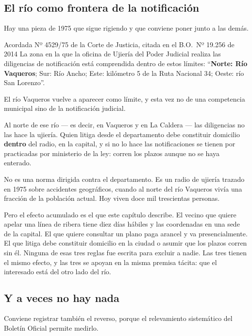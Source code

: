\subsection*{El río como frontera de la notificación}

Hay una pieza de 1975 que sigue rigiendo y que conviene poner junto a las demás.

\begin{ficha}{Acordada Nº 4529/75 de la Corte de Justicia, citada en el B.O.\ Nº 19.256 de 2014}
La zona en la que la oficina de Ujiería del Poder Judicial realiza las diligencias de notificación está comprendida dentro de estos límites: ``\textbf{Norte: Río Vaqueros}; Sur: Río Ancho; Este: kilómetro 5 de la Ruta Nacional 34; Oeste: río San Lorenzo''.
\end{ficha}

El río Vaqueros vuelve a aparecer como límite, y esta vez no de una competencia municipal sino de la notificación judicial.

Al norte de ese río --- es decir, en Vaqueros y en La Caldera --- las diligencias no las hace la ujiería. Quien litiga desde el departamento debe constituir domicilio \textbf{dentro} del radio, en la capital, y si no lo hace las notificaciones se tienen por practicadas por ministerio de la ley: corren los plazos aunque no se haya enterado.

No es una norma dirigida contra el departamento. Es un radio de ujiería trazado en 1975 sobre accidentes geográficos, cuando al norte del río Vaqueros vivía una fracción de la población actual. Hoy viven doce mil trescientas personas.

Pero el efecto acumulado es el que este capítulo describe. El vecino que quiere apelar una línea de ribera tiene diez días hábiles y las coordenadas en una sede de la capital. El que quiere consultar un plano paga arancel y va presencialmente. El que litiga debe constituir domicilio en la ciudad o asumir que los plazos corren sin él. Ninguna de esas tres reglas fue escrita para excluir a nadie. Las tres tienen el mismo efecto, y las tres se apoyan en la misma premisa tácita: que el interesado está del otro lado del río.

\subsection*{Y a veces no hay nada}

Conviene registrar también el reverso, porque el relevamiento sistemático del Boletín Oficial permite medirlo.

